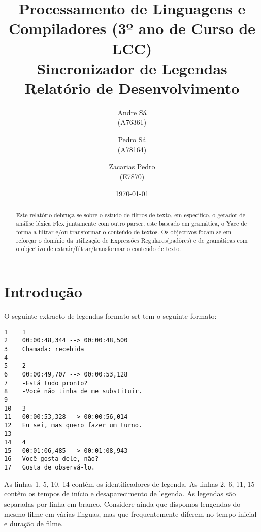 \documentclass{report}
\title{Processamento de Linguagens e Compiladores (3º ano de Curso de LCC)\\ \textbf{Sincronizador de Legendas}\\ Relatório de Desenvolvimento}
\author{Andre Sá\\ (A76361) \and Pedro Sá\\ (A78164) \and Zacarias Pedro\\ (E7870) }
\date{\today}
\begin{document}
\maketitle

\begin{abstract}
Este relatório debruça-se sobre o estudo de filtros de texto, em específico, o gerador de análise léxica Flex juntamente com outro parser, este baseado em gramática, o Yacc de forma a filtrar e/ou transformar o conteúdo de textos.
Os objectivos focam-se em reforçar o domínio da utilização de Expressões Regulares(padõres) e de gramáticas com o objectivo de extrair/filtrar/transformar o conteúdo de texto.
\end{abstract}

\tableofcontents

\chapter{Introdução} \label{intro}
O seguinte extracto de legendas formato srt tem o seguinte formato:

\begin{verbatim}
1    1
2    00:00:48,344 --> 00:00:48,500
3    Chamada: recebida
4
5    2
6    00:00:49,707 --> 00:00:53,128
7    -Está tudo pronto?
8    -Você não tinha de me substituir.
9
10   3
11   00:00:53,328 --> 00:00:56,014
12   Eu sei, mas quero fazer um turno.
13
14   4
15   00:01:06,485 --> 00:01:08,943
16   Você gosta dele, não?
17   Gosta de observá-lo.
\end{verbatim}

As linhas 1, 5, 10, 14 contêm os identificadores de legenda. As linhas 2, 6, 11, 15 contêm os tempos de início e desaparecimento de legenda.
As legendas são separadas por linha em branco. Considere ainda que dispomos lengendas do mesmo filme em várias línguas, mas que frequentemente diferem no tempo inicial e duração de filme.
\end{document}
